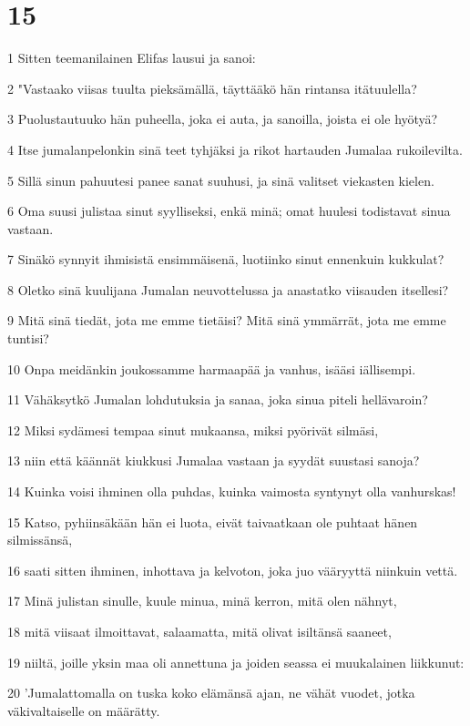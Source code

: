 \chapter{15}

\par 1 Sitten teemanilainen Elifas lausui ja sanoi:
\par 2 "Vastaako viisas tuulta pieksämällä, täyttääkö hän rintansa itätuulella?
\par 3 Puolustautuuko hän puheella, joka ei auta, ja sanoilla, joista ei ole hyötyä?
\par 4 Itse jumalanpelonkin sinä teet tyhjäksi ja rikot hartauden Jumalaa rukoilevilta.
\par 5 Sillä sinun pahuutesi panee sanat suuhusi, ja sinä valitset viekasten kielen.
\par 6 Oma suusi julistaa sinut syylliseksi, enkä minä; omat huulesi todistavat sinua vastaan.
\par 7 Sinäkö synnyit ihmisistä ensimmäisenä, luotiinko sinut ennenkuin kukkulat?
\par 8 Oletko sinä kuulijana Jumalan neuvottelussa ja anastatko viisauden itsellesi?
\par 9 Mitä sinä tiedät, jota me emme tietäisi? Mitä sinä ymmärrät, jota me emme tuntisi?
\par 10 Onpa meidänkin joukossamme harmaapää ja vanhus, isääsi iällisempi.
\par 11 Vähäksytkö Jumalan lohdutuksia ja sanaa, joka sinua piteli hellävaroin?
\par 12 Miksi sydämesi tempaa sinut mukaansa, miksi pyörivät silmäsi,
\par 13 niin että käännät kiukkusi Jumalaa vastaan ja syydät suustasi sanoja?
\par 14 Kuinka voisi ihminen olla puhdas, kuinka vaimosta syntynyt olla vanhurskas!
\par 15 Katso, pyhiinsäkään hän ei luota, eivät taivaatkaan ole puhtaat hänen silmissänsä,
\par 16 saati sitten ihminen, inhottava ja kelvoton, joka juo vääryyttä niinkuin vettä.
\par 17 Minä julistan sinulle, kuule minua, minä kerron, mitä olen nähnyt,
\par 18 mitä viisaat ilmoittavat, salaamatta, mitä olivat isiltänsä saaneet,
\par 19 niiltä, joille yksin maa oli annettuna ja joiden seassa ei muukalainen liikkunut:
\par 20 'Jumalattomalla on tuska koko elämänsä ajan, ne vähät vuodet, jotka väkivaltaiselle on määrätty.
